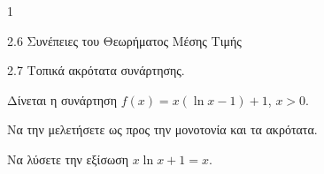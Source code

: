 \begin{ylh}{1}
    \item 2.6 Συνέπειες του Θεωρήματος Μέσης Τιμής
    \item 2.7 Τοπικά ακρότατα συνάρτησης.
\end{ylh}
Δίνεται η συνάρτηση $f(x)=x(\ln x-1)+1$, $x>0$.
\begin{alist}
\item Να την μελετήσετε ως προς την μονοτονία και τα ακρότατα. 
\item Να λύσετε την εξίσωση $x\ln x+1=x$. 
\end{alist}